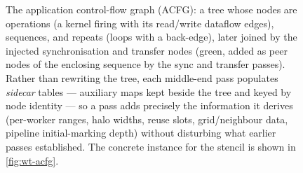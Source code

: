 \begin{figure}[tbp]
{}
  \caption[The ACFG data structure]{The application control-flow graph (ACFG):
    a tree whose nodes are operations (a kernel firing with its read/write
    dataflow edges), sequences, and repeats (loops with a back-edge), later
    joined by the injected synchronisation and transfer nodes (green, added as
    peer nodes of the enclosing sequence by the sync and transfer passes). Rather
    than rewriting the tree, each middle-end pass populates \emph{sidecar}
    tables ---
    auxiliary maps kept beside the tree and keyed by node identity --- so a pass
    adds precisely the information it derives (per-worker ranges, halo widths,
    reuse slots, grid/neighbour data, pipeline initial-marking depth) without
    disturbing what earlier passes established. The concrete instance for the
    stencil is shown in \cref{fig:wt-acfg}.}
  \label{fig:acfg}
\end{figure}
